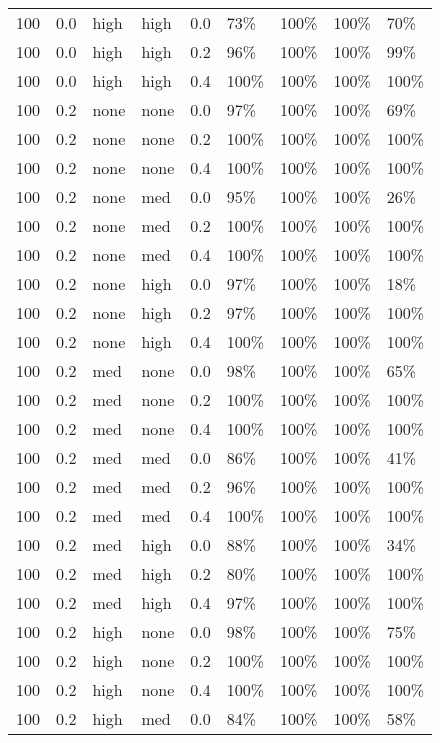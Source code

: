 \begin{longtable}{rrllrllll}
  100 & 0.0 & high & high & 0.0 & 73\% & 100\% & 100\% & 70\% \\ 
  100 & 0.0 & high & high & 0.2 & 96\% & 100\% & 100\% & 99\% \\ 
  100 & 0.0 & high & high & 0.4 & 100\% & 100\% & 100\% & 100\% \\ 
  100 & 0.2 & none & none & 0.0 & 97\% & 100\% & 100\% & 69\% \\ 
  100 & 0.2 & none & none & 0.2 & 100\% & 100\% & 100\% & 100\% \\ 
  100 & 0.2 & none & none & 0.4 & 100\% & 100\% & 100\% & 100\% \\ 
  100 & 0.2 & none & med & 0.0 & 95\% & 100\% & 100\% & 26\% \\ 
  100 & 0.2 & none & med & 0.2 & 100\% & 100\% & 100\% & 100\% \\ 
  100 & 0.2 & none & med & 0.4 & 100\% & 100\% & 100\% & 100\% \\ 
  100 & 0.2 & none & high & 0.0 & 97\% & 100\% & 100\% & 18\% \\ 
  100 & 0.2 & none & high & 0.2 & 97\% & 100\% & 100\% & 100\% \\ 
  100 & 0.2 & none & high & 0.4 & 100\% & 100\% & 100\% & 100\% \\ 
  100 & 0.2 & med & none & 0.0 & 98\% & 100\% & 100\% & 65\% \\ 
  100 & 0.2 & med & none & 0.2 & 100\% & 100\% & 100\% & 100\% \\ 
  100 & 0.2 & med & none & 0.4 & 100\% & 100\% & 100\% & 100\% \\ 
  100 & 0.2 & med & med & 0.0 & 86\% & 100\% & 100\% & 41\% \\ 
  100 & 0.2 & med & med & 0.2 & 96\% & 100\% & 100\% & 100\% \\ 
  100 & 0.2 & med & med & 0.4 & 100\% & 100\% & 100\% & 100\% \\ 
  100 & 0.2 & med & high & 0.0 & 88\% & 100\% & 100\% & 34\% \\ 
  100 & 0.2 & med & high & 0.2 & 80\% & 100\% & 100\% & 100\% \\ 
  100 & 0.2 & med & high & 0.4 & 97\% & 100\% & 100\% & 100\% \\ 
  100 & 0.2 & high & none & 0.0 & 98\% & 100\% & 100\% & 75\% \\ 
  100 & 0.2 & high & none & 0.2 & 100\% & 100\% & 100\% & 100\% \\ 
  100 & 0.2 & high & none & 0.4 & 100\% & 100\% & 100\% & 100\% \\ 
  100 & 0.2 & high & med & 0.0 & 84\% & 100\% & 100\% & 58\% \\ 

\end{longtable}
